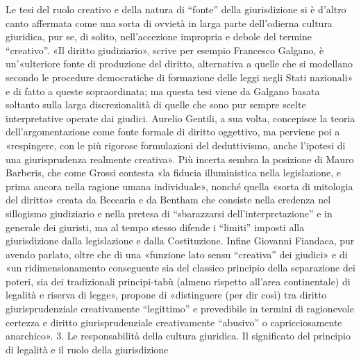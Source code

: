 Le tesi del ruolo creativo e della natura di “fonte” della giurisdizione si è d’altro canto affermata come una sorta di ovvietà in larga parte dell’odierna cultura giuridica, pur se, di solito, nell’accezione impropria e debole del termine “creativo”. «Il diritto giudiziario», scrive per esempio Francesco Galgano, è un’«ulteriore fonte di produzione del diritto, alternativa a quelle che si modellano secondo le procedure democratiche di formazione delle leggi negli Stati nazionali» e di fatto a queste sopraordinata; ma questa tesi viene da Galgano basata soltanto sulla larga discrezionalità di quelle che sono pur sempre scelte interpretative operate dai giudici. Aurelio Gentili, a sua volta, concepisce la teoria dell’argomentazione come fonte formale di diritto oggettivo, ma perviene poi a «respingere, con le più rigorose formulazioni del deduttivismo, anche l’ipotesi di una giurisprudenza realmente creativa». Più incerta sembra la posizione di Mauro Barberis, che come Grossi contesta «la fiducia illuministica nella legislazione, e prima ancora nella ragione umana individuale», nonché quella «sorta di mitologia del diritto» creata da Beccaria e da Bentham che consiste nella credenza nel sillogismo giudiziario e nella pretesa di “sbarazzarsi dell’interpretazione” e in generale dei giuristi, ma al tempo stesso difende i “limiti” imposti alla giurisdizione dalla legislazione e dalla Costituzione. Infine Giovanni Fiandaca, pur avendo parlato, oltre che di una «funzione lato sensu “creativa” dei giudici» e di «un ridimensionamento conseguente sia del classico principio della separazione dei poteri, sia dei tradizionali principi-tabù (almeno rispetto all’area continentale) di legalità e riserva di legge», propone di «distinguere (per dir così) tra diritto giurisprudenziale creativamente “legittimo” e prevedibile in termini di ragionevole certezza e diritto giurisprudenziale creativamente “abusivo” o capricciosamente anarchico».
3. Le responsabilità della cultura giuridica. Il significato del principio di legalità e il ruolo della giurisdizione
